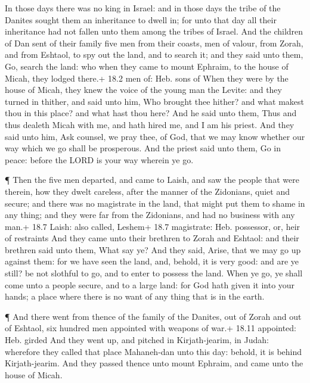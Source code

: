  In those days there was no king in Israel: and in those
days the tribe of the Danites sought them an inheritance to dwell in;
for unto that day all their inheritance had not fallen unto them among
the tribes of Israel.  And the children of Dan sent of their
family five men from their coasts, men of valour, from Zorah, and from
Eshtaol, to spy out the land, and to search it; and they said unto them,
Go, search the land: who when they came to mount Ephraim, to the house
of Micah, they lodged there.+ 18.2 men of: Heb. sons of 
When they were by the house of Micah, they knew the voice of the young
man the Levite: and they turned in thither, and said unto him, Who
brought thee hither? and what makest thou in this place? and what hast
thou here?  And he said unto them, Thus and thus dealeth
Micah with me, and hath hired me, and I am his priest.  And
they said unto him, Ask counsel, we pray thee, of God, that we may know
whether our way which we go shall be prosperous.  And the
priest said unto them, Go in peace: before the LORD is your way wherein
ye go.

 ¶ Then the five men departed, and came to Laish, and saw
the people that were therein, how they dwelt careless, after the manner
of the Zidonians, quiet and secure; and there was no magistrate in the
land, that might put them to shame in any thing; and they were far from
the Zidonians, and had no business with any man.+ 18.7 Laish: also
called, Leshem+ 18.7 magistrate: Heb. possessor, or, heir of restraints
 And they came unto their brethren to Zorah and Eshtaol: and
their brethren said unto them, What say ye?  And they said,
Arise, that we may go up against them: for we have seen the land, and,
behold, it is very good: and are ye still? be not slothful to go, and to
enter to possess the land.  When ye go, ye shall come unto
a people secure, and to a large land: for God hath given it into your
hands; a place where there is no want of any thing that is in the earth.

 ¶ And there went from thence of the family of the Danites,
out of Zorah and out of Eshtaol, six hundred men appointed with weapons
of war.+ 18.11 appointed: Heb. girded  And they went up,
and pitched in Kirjath-jearim, in Judah: wherefore they called that
place Mahaneh-dan unto this day: behold, it is behind Kirjath-jearim.
 And they passed thence unto mount Ephraim, and came unto
the house of Micah.

